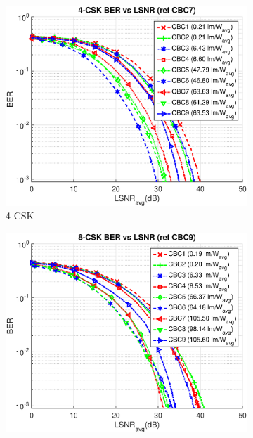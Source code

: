 \documentclass[10pt,letterpaper]{article}
\begin{document}
\begin{figure}[t]
	\centering
		\begin{subfigure}{0.32\textwidth}
		\centering
			\includegraphics[trim={0.0in 0.0in 0.1in 0.38in}, clip=true, width=\textwidth]{M04_4-CSK_BERvsLSNR_NL.eps}
			\caption{4-CSK}
			\label{fig4LSNR}
		\end{subfigure}
		\begin{subfigure}{0.32\textwidth}
		\centering
			\includegraphics[trim={0.0in 0.0in 0.1in 0.38in}, clip=true, width=\textwidth]{M08_8-CSK_BERvsLSNR_NL.eps}

\end{subfigure}
\end{figure}
\end{document}
